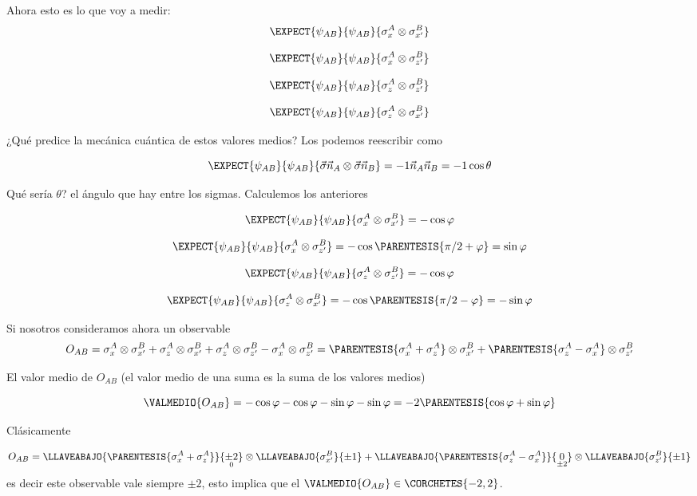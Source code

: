 Ahora esto es lo que voy a medir:
\[
\EXPECT{\psi_{AB}}{\psi_{AB}}{\sigma_{x}^{A}\otimes\sigma_{x'}^{B}}
\]

\[
\EXPECT{\psi_{AB}}{\psi_{AB}}{\sigma_{x}^{A}\otimes\sigma_{z'}^{B}}
\]

\[
\EXPECT{\psi_{AB}}{\psi_{AB}}{\sigma_{z}^{A}\otimes\sigma_{z'}^{B}}
\]

\[
\EXPECT{\psi_{AB}}{\psi_{AB}}{\sigma_{z}^{A}\otimes\sigma_{x'}^{B}}
\]

¿Qué predice la mecánica cuántica de estos valores medios? Los podemos
reescribir como

\[
\EXPECT{\psi_{AB}}{\psi_{AB}}{\vec{\sigma}\vec{n}_{A}\otimes\vec{\sigma}\vec{n}_{B}}=-1\vec{n}_{A}\vec{n}_{B}=-1\cos\theta
\]

Qué sería $\theta$? el ángulo que hay entre los sigmas. Calculemos
los anteriores

\[
\EXPECT{\psi_{AB}}{\psi_{AB}}{\sigma_{x}^{A}\otimes\sigma_{x'}^{B}}=-\cos\varphi
\]

\[
\EXPECT{\psi_{AB}}{\psi_{AB}}{\sigma_{x}^{A}\otimes\sigma_{z'}^{B}}=-\cos\PARENTESIS{\pi/2+\varphi}=\sin\varphi
\]

\[
\EXPECT{\psi_{AB}}{\psi_{AB}}{\sigma_{z}^{A}\otimes\sigma_{z'}^{B}}=-\cos\varphi
\]

\[
\EXPECT{\psi_{AB}}{\psi_{AB}}{\sigma_{z}^{A}\otimes\sigma_{x'}^{B}}=-\cos\PARENTESIS{\pi/2-\varphi}=-\sin\varphi
\]

Si nosotros consideramos ahora un observable 
\[
O_{AB}=\sigma_{x}^{A}\otimes\sigma_{x'}^{B}+\sigma_{z}^{A}\otimes\sigma_{x'}^{B}+\sigma_{z}^{A}\otimes\sigma_{z'}^{B}-\sigma_{x}^{A}\otimes\sigma_{z'}^{B}=\PARENTESIS{\sigma_{x}^{A}+\sigma_{z}^{A}}\otimes\sigma_{x'}^{B}+\PARENTESIS{\sigma_{z}^{A}-\sigma_{x}^{A}}\otimes\sigma_{z'}^{B}
\]

El valor medio de $O_{AB}$ (el valor medio de una suma es la suma
de los valores medios)

\[
\VALMEDIO{O_{AB}}=-\cos\varphi-\cos\varphi-\sin\varphi-\sin\varphi=-2\PARENTESIS{\cos\varphi+\sin\varphi}
\]

Clásicamente 

\[
O_{AB}=\LLAVEABAJO{\PARENTESIS{\sigma_{x}^{A}+\sigma_{z}^{A}}}{\underset{0}{\pm2}}\otimes\LLAVEABAJO{\sigma_{x'}^{B}}{\pm1}+\LLAVEABAJO{\PARENTESIS{\sigma_{z}^{A}-\sigma_{x}^{A}}}{\underset{\pm2}{0}}\otimes\LLAVEABAJO{\sigma_{z'}^{B}}{\pm1}
\]
es decir este observable vale siempre $\pm2$, esto implica que el
$\VALMEDIO{O_{AB}}\in\CORCHETES{-2,2}$.

